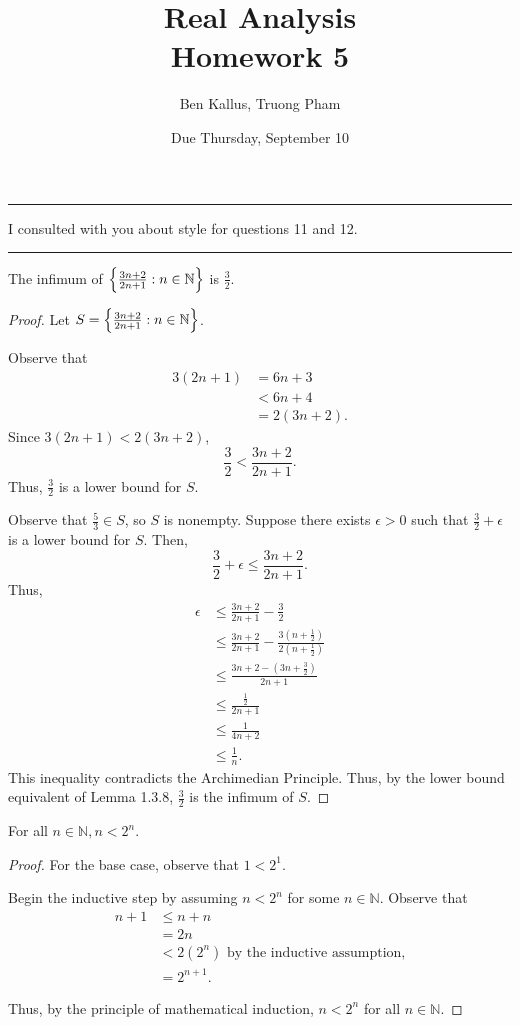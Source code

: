 \documentclass[12pt]{article}
\title{Real Analysis \\ Homework 5}
\author{Ben Kallus, Truong Pham}
\date{Due Thursday, September 10}
\begin{document}
\maketitle

\hrule
\bigskip

 I consulted with you about style for questions 11 and 12.

\bigskip
\hrule
\bigskip

 The infimum of $\Big{\{}\frac{3n+2}{2n+1} : n \in \mathbb N\Big{\}}$ is $\frac 3 2$.

\begin{proof}
    Let $S = \Big{\{}\frac{3n+2}{2n+1} : n \in \mathbb N\Big{\}}$.
    
    Observe that \begin{align*}
        3(2n + 1) &= 6n + 3 \\
                  &< 6n + 4 \\
                  &= 2(3n + 2).
    \end{align*}
    Since $3(2n + 1) < 2(3n + 2)$, $$\frac32 < \frac{3n+2}{2n+1}.$$
    Thus, $\frac32$ is a lower bound for $S$.
    
    Observe that $\frac53 \in S$, so $S$ is nonempty. Suppose there exists $\epsilon > 0$ such that $\frac32 + \epsilon$ is a lower bound for $S$. Then, $$\frac32 + \epsilon \leq \frac{3n+2}{2n+1}.$$
    Thus,
    \begin{align*}
        \epsilon &\leq \frac{3n+2}{2n+1} - \frac32 \\
                 &\leq \frac{3n+2}{2n+1} - \frac{3(n + \frac12)}{2(n + \frac12)} \\
                 &\leq \frac{3n+2 - (3n + \frac32)}{2n+1} \\
                 &\leq \frac{\frac12}{2n+1} \\
                 &\leq \frac{1}{4n+2} \\
                 &\leq \frac{1}{n}.
    \end{align*}
    This inequality contradicts the Archimedian Principle.
    Thus, by the lower bound equivalent of Lemma 1.3.8, $\frac32$ is the infimum of $S$.
\end{proof}

\newpage
{} For all $n \in \mathbb N, n < 2^n$.

\begin{proof}
    For the base case, observe that $1 < 2^1$.
    
    Begin the inductive step by assuming $n < 2^n$ for some $n \in \mathbb N$. Observe that
    \begin{align*}
        n + 1 &\leq n + n \\
              &= 2n \\
              &< 2(2^n) \text{ by the inductive assumption,}\\
              &=2^{n+1}.
    \end{align*}
    
    Thus, by the principle of mathematical induction, $n < 2^n$ for all $n \in \mathbb N$.
\end{proof}
\end{document}
